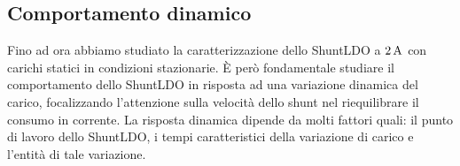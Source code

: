 \subsection{Comportamento dinamico}

Fino ad ora abbiamo studiato la caratterizzazione dello ShuntLDO a $2\rm \, A$ con carichi statici in condizioni stazionarie. \`E per\`o fondamentale studiare il comportamento dello ShuntLDO in risposta ad una variazione dinamica del carico, focalizzando l'attenzione sulla velocità dello shunt nel riequilibrare il consumo in corrente. 
La risposta dinamica dipende da molti fattori quali: il punto di lavoro dello ShuntLDO, i tempi caratteristici della variazione di carico e l'entità di tale variazione. 


